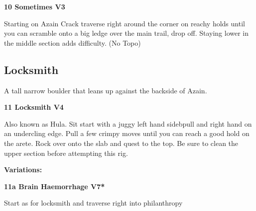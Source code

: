 \begin{multicols}{2}
			
			
			\needspace{1.5cm}
\label{rt:Sometimes}
\colorbox{green!20}{
\parbox{0.95\linewidth}{
\textbf{
10 Sometimes V3  
}}}

			\begin{adjustwidth}{0.5cm}{}			
			Starting on Azain Crack traverse right around the corner on reachy holds until you can scramble onto a big ledge over the main trail, drop off. Staying lower in the middle section adds difficulty. (No Topo)
			\end{adjustwidth}
			
			
		


		\needspace{1.5cm}
		\subsection*{Locksmith}\label{bf:Locksmith}
		A tall narrow boulder that leans up against the backside of Azain.\\
	
		
			
			\needspace{1.5cm}
\label{rt:Locksmith}
\colorbox{RoyalBlue!20}{
\parbox{0.95\linewidth}{
\textbf{
11 Locksmith V4  \warn\warn
}}}

			\begin{adjustwidth}{0.5cm}{}			
			Also known as Hula. Sit start with a juggy left hand sidebpull and right hand on an undercling edge. Pull a few crimpy moves until you can reach a good hold on the arete. Rock over onto the slab and quest to the top. Be sure to clean the upper section before attempting this rig.
			\end{adjustwidth}
			
				\begin{adjustwidth}{0.5cm}{}				
				\needspace{3cm}
				\textbf{Variations:} \newline
					
					\needspace{1.5cm}
\label{vr:Brain Haemorrhage}
\colorbox{Goldenrod!50}{
\parbox{0.95\linewidth}{
\textbf{
11a Brain Haemorrhage V7*  
}}}

					\begin{adjustwidth}{0.5cm}{}			
					Start as for locksmith and traverse right into philanthropy
					\end{adjustwidth}
					
					
				\end{adjustwidth}
			

\end{multicols}
